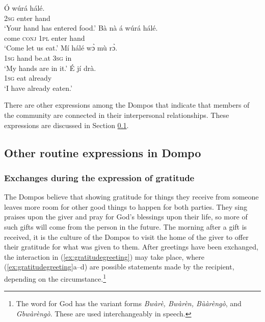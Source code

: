 \documentclass[output=paper,colorlinks,citecolor=brown]{langscibook}
\begin{document}
\ea \label{ex:eatinggreeting}
\begin{xlist}
\ex 
    \gll Ó	wúrá	hálé.\\
						\textsc{2sg}	enter	hand\\
	\glt	‘Your hand has entered food.’
\ex
   \gll  Bà	nà	á	wúrá	hálé.\\
						come	\textsc{conj}	\textsc{1pl}	enter	hand\\
		\glt ‘Come let us eat.’
\ex
   \gll Mí	hálé	wɔ̀	mù	rɔ̀.\\
    						\textsc{1sg}	hand	be.at	\textsc{3sg}	in	\\
\glt			‘My hands are in it.’
 \ex
   \gll É	jí	drà.\\
   						\textsc{1sg}	eat	already		\\
\glt			‘I have already eaten.’
\end{xlist}
\z

There are other expressions among the Dompos that indicate that members of the community are connected in their interpersonal relationships. These expressions are discussed in Section \ref{Other routine expressions in Dompo}.

\subsection{Other routine expressions in Dompo}
\label{Other routine expressions in Dompo}

\subsubsection{Exchanges during the expression of gratitude}

The Dompos believe that showing gratitude for things they receive from someone leaves more room for other good things to happen for both parties. They sing praises upon the giver and pray for God’s blessings upon their life, so more of such gifts will come from the person in the future. The morning after a gift is received, it is the culture of the Dompos to visit the home of the giver to offer their gratitude for what was given to them. After greetings have been exchanged, the interaction in (\ref{ex:gratitudegreeting}) may take place, where (\ref{ex:gratitudegreeting}a--d) are possible statements made by the recipient, depending on the circumstance.\footnote{The word for God has the variant forms \textit{Bwàrè, Bwàrèn, Bùàrèngò}, and \textit{Gbwàrèngò}. These are used interchangeably in speech.}
\end{document}
